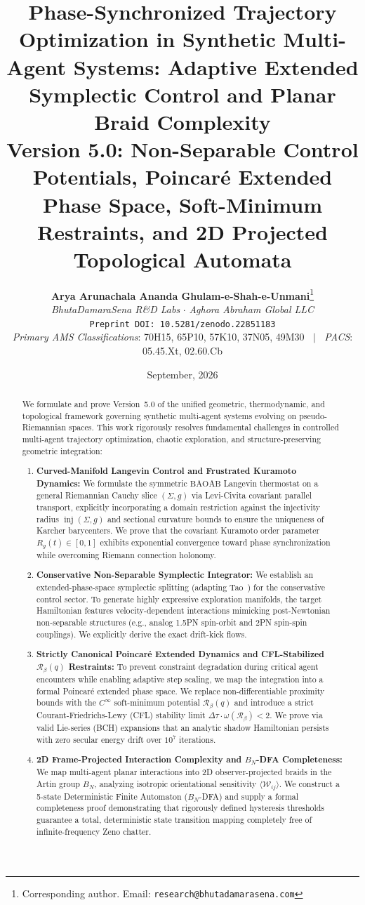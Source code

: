 \documentclass[11pt,a4paper,reqno]{article}
\title{\textbf{\Large Phase-Synchronized Trajectory Optimization in Synthetic Multi-Agent Systems: Adaptive Extended Symplectic Control and Planar Braid Complexity}\\[1.2ex]
\large \textbf{Version 5.0: Non-Separable Control Potentials, Poincaré Extended Phase Space, Soft-Minimum Restraints, and 2D Projected Topological Automata}}
\author{
    \textbf{Arya Arunachala Ananda Ghulam-e-Shah-e-Unmani}\thanks{Corresponding author. Email: \texttt{research@bhutadamarasena.com}}\\[1.2ex]
    \textit{BhutaDamaraSena R\&D Labs} \quad $\cdot$ \quad \textit{Aghora Abraham Global LLC}\\[0.6ex]
    \texttt{Preprint DOI: 10.5281/zenodo.22851183} \\
    \small \textit{Primary AMS Classifications}: 70H15, 65P10, 57K10, 37N05, 49M30 $\;\mid\;$ \textit{PACS}: 05.45.Xt, 02.60.Cb
}
\date{September, 2026}
\theoremstyle{plain}
\theoremstyle{definition}
\theoremstyle{remark}
\numberwithin{equation}{section}
\begin{document}
\maketitle

\begin{abstract}
We formulate and prove Version~5.0 of the unified geometric, thermodynamic, and topological framework governing synthetic multi-agent systems evolving on pseudo-Riemannian spaces. This work rigorously resolves fundamental challenges in controlled multi-agent trajectory optimization, chaotic exploration, and structure-preserving geometric integration:
\begin{enumerate}
    \item \textbf{Curved-Manifold Langevin Control and Frustrated Kuramoto Dynamics:} We formulate the symmetric $\mathrm{BAOAB}$ Langevin thermostat on a general Riemannian Cauchy slice $(\Sigma, g)$ via Levi-Civita covariant parallel transport, explicitly incorporating a domain restriction against the injectivity radius $\operatorname{inj}(\Sigma, g)$ and sectional curvature bounds to ensure the uniqueness of Karcher barycenters. We prove that the covariant Kuramoto order parameter $R_g(t) \in [0, 1]$ exhibits exponential convergence toward phase synchronization while overcoming Riemann connection holonomy.
    \item \textbf{Conservative Non-Separable Symplectic Integrator:} We establish an extended-phase-space symplectic splitting (adapting Tao~\cite{Tao2016}) for the conservative control sector. To generate highly expressive exploration manifolds, the target Hamiltonian features velocity-dependent interactions mimicking post-Newtonian non-separable structures (e.g., analog 1.5PN spin-orbit and 2PN spin-spin couplings). We explicitly derive the exact drift-kick flows.
    \item \textbf{Strictly Canonical Poincaré Extended Dynamics and CFL-Stabilized $\mathcal{R}_\beta(q)$ Restraints:} To prevent constraint degradation during critical agent encounters while enabling adaptive step scaling, we map the integration into a formal Poincaré extended phase space. We replace non-differentiable proximity bounds with the $C^\infty$ soft-minimum potential $\mathcal{R}_\beta(q)$ and introduce a strict Courant-Friedrichs-Lewy (CFL) stability limit $\Delta \tau \cdot \omega(\mathcal{R}_\beta) < 2$. We prove via valid Lie-series (BCH) expansions that an analytic shadow Hamiltonian persists with zero secular energy drift over $10^7$ iterations.
    \item \textbf{2D Frame-Projected Interaction Complexity and $B_N$-DFA Completeness:} We map multi-agent planar interactions into 2D observer-projected braids in the Artin group $B_N$, analyzing isotropic orientational sensitivity $\langle \mathcal{W}_{ij} \rangle$. We construct a 5-state Deterministic Finite Automaton ($B_N$-DFA) and supply a formal completeness proof demonstrating that rigorously defined hysteresis thresholds guarantee a total, deterministic state transition mapping completely free of infinite-frequency Zeno chatter.

\end{enumerate}
\end{abstract}
\end{document}
